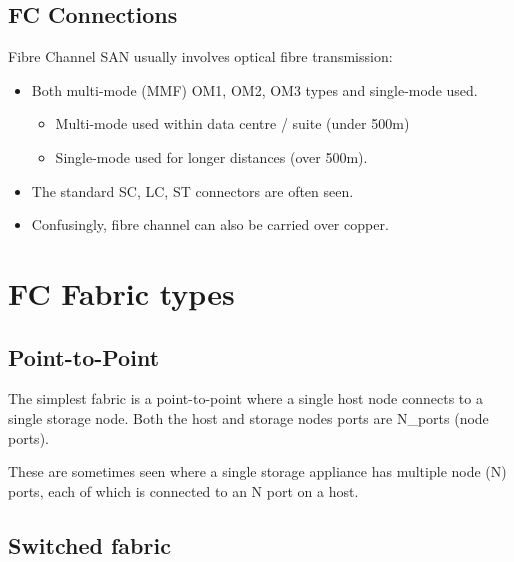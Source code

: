 \documentclass[slides]{pgnotes}
\begin{document}

\subsection{FC Connections}
\label{sec:fc-connections}

Fibre Channel SAN usually involves optical fibre transmission:

\begin{itemize}
\item
  Both multi-mode (MMF) OM1, OM2, OM3 types and single-mode used.
  \begin{itemize}
  \item Multi-mode used within data centre / suite (under 500m)
  \item Single-mode used for longer distances (over 500m).
  \end{itemize}
\item
  The standard SC, LC, ST connectors are often seen.
\item
  Confusingly, fibre channel can also be carried over copper.
\end{itemize}



\section{FC Fabric types}
\label{sec:fc-fabric-types}

\subsection{Point-to-Point}
\label{sec:point-to-point}

The simplest fabric is a point-to-point where a single host node
connects to a single storage node. Both the host and storage nodes ports
are N\_ports (node ports).


These are sometimes seen where a single storage appliance has multiple node (N)
ports, each of which is connected to an N port on a host.

\subsection{Switched fabric}
\label{sec:switched-fabric}
\end{document}
